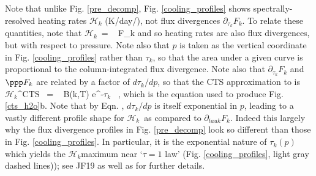 \documentclass[10pt]{article}
\newcommand{\ch}{\ensuremath{\mathcal{H}}}
\newcommand{\chk}{\ensuremath{\ch_k}}
\newcommand{\tauk}{\ensuremath{\tau_k}}
\newcommand{\SX}{\ensuremath{\mathrm{SX}}}
\newcommand{\CTS}{\ensuremath{\mathrm{CTS}}}
\begin{document}
Note that unlike Fig. \ref{pre_decomp}, Fig. \ref{cooling_profiles} shows spectrally-resolved heating rates $\chk$ (K/day/\cminverse), not flux divergences $\partial_{\tauk} F_k$. To relate these quantities, note that 
\beqn
	\chk \ = \   \ppp F_k 
	\label{chk}
\eeqn
and so heating rates are also flux divergences, but with respect to pressure. Note also  that $p$ is taken as the vertical coordinate in Fig. \ref{cooling_profiles} rather than \tauk, so that the area under a given curve is proportional to the column-integrated flux divergence. Note also that $\partial_{\tauk} F_k$ and $\ppp F_k$ are related by a factor of $d \tauk/dp$, so that the CTS approximation to  is
\beqn
	\chk^{\CTS} \ = \  \pi B(k,T) \der{\tauk}{p}e^{-\tauk} \ ,
	\label{chk_cts}
\eeqn
which is the equation used to produce Fig. \ref{cts_h2o}b. Note that by Eqn. , $d\tauk/dp$ is itself exponential in $p$, leading to a vastly different profile shape for \chk\ as compared to $\partial_{tauk} F_k$. Indeed this largely why the flux divergence profiles in Fig. \ref{pre_decomp} look so different than those in Fig. \ref{cooling_profiles}. In particular, it is the exponential nature of $\tauk(p)$ which yields the  \chk maximum near `$\tau=1$ law' (Fig. \ref{cooling_profiles}, light gray dashed lines));  see JF19 as well as  \cite{huang2014} for further details.

\end{document}
